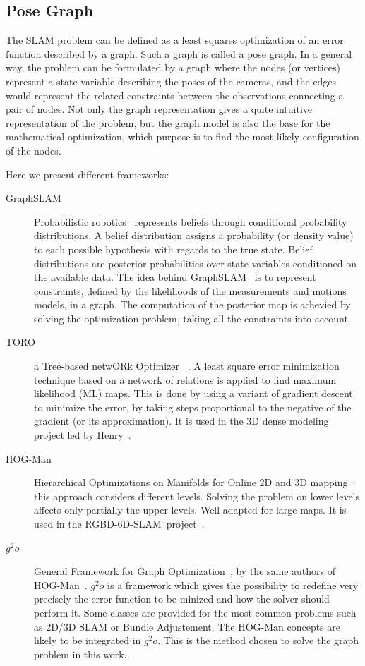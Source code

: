 \subsection{Pose Graph}

The \gls{SLAM} problem can be defined as a least squares optimization of an error function described by a graph. Such a graph is called a pose graph. In a general way, the problem can be formulated by a graph where the nodes (or vertices) represent a state variable describing the poses of the cameras, and the edges would represent the related constraints between the observations connecting a pair of nodes. Not only the graph representation gives a quite intuitive representation of the problem, but the graph model is also the base for the mathematical optimization, which purpose is to find the most-likely configuration of the nodes.

Here we present different frameworks:

\begin{description}
\item[GraphSLAM] Probabilistic robotics~\cite{Thrun_2005} represents beliefs through conditional probability distributions. A belief distribution assigns a probability (or density value) to each possible hypothesis with regards to the true state. Belief distributions are posterior probabilities over state variables conditioned on the available data. The idea behind GraphSLAM~\cite{Thrun05_GraphSLAM} is to represent constraints, defined by the likelihoods of the measurements and motions models, in a graph. The computation of the posterior map is achevied by solving the optimization problem, taking all the constraints into account.
\item[TORO] a Tree-based netwORk Optimizer ~\cite{grisetti07rss}. A least square error minimization technique based on a network of relations is applied to find maximum likelihood (ML) maps. This is done by using a variant of gradient descent to minimize the error, by taking steps proportional to the negative of the gradient (or its approximation). It is used in the 3D dense modeling project led by Henry~\cite{Henry_RGBD_2010}.
\item[HOG-Man] Hierarchical Optimizations on Manifolds for Online 2D and 3D mapping~\cite{hogman_2010}: this approach considers different levels. Solving the problem on lower levels affects only partially the upper levels. Well adapted for large maps. It is used in the RGBD-6D-SLAM~project~\cite{engelhard11euron-workshop}.
\item[$g^2o$] General Framework for Graph Optimization~\cite{g2o_2011}, by the same authors of HOG-Man~\cite{hogman_2010}. $g^2o$ is a framework which gives the possibility to redefine very precisely the error function to be minized and how the solver should perform it. Some classes are provided for the most common problems such as 2D/3D \gls{SLAM} or Bundle Adjustement. The HOG-Man concepts are likely to be integrated in $g^2o$. This is the method chosen to solve the graph problem in this work.
\end{description}

